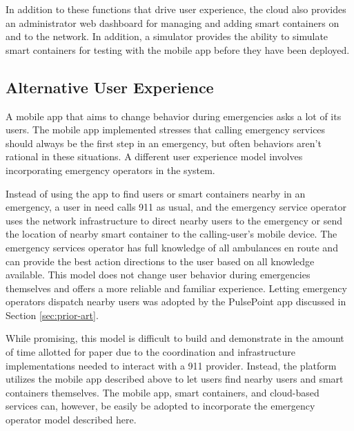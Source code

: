 In addition to these functions that drive user experience, the cloud also provides an administrator web dashboard for managing and adding smart containers on and to the network. In addition, a simulator provides the ability to simulate smart containers for testing with the mobile app before they have been deployed.

\subsection{Alternative User Experience} \label{sec:alt-user-ex}
 
A mobile app that aims to change behavior during emergencies asks a lot of its users. The mobile app implemented stresses that calling emergency services should always be the first step in an emergency, but often behaviors aren't rational in these situations. A different user experience model involves incorporating emergency operators in the system. 

Instead of using the app to find users or smart containers nearby in an emergency, a user in need calls 911 as usual, and the emergency service operator uses the network infrastructure to direct nearby users to the emergency or send the location of nearby smart container to the calling-user's mobile device. The emergency services operator has full knowledge of all ambulances en route and can provide the best action directions to the user based on all knowledge available. This model does not change user behavior during emergencies themselves and offers a more reliable and familiar experience. Letting emergency operators dispatch nearby users was adopted by the PulsePoint app discussed in Section \ref{sec:prior-art}.

While promising, this model is difficult to build and demonstrate in the amount of time allotted for paper due to the coordination and infrastructure implementations needed to interact with a 911 provider. Instead, the platform utilizes the mobile app described above to let users find nearby users and smart containers themselves. The mobile app, smart containers, and cloud-based services can, however, be easily be adopted to incorporate the emergency operator model described here.


 